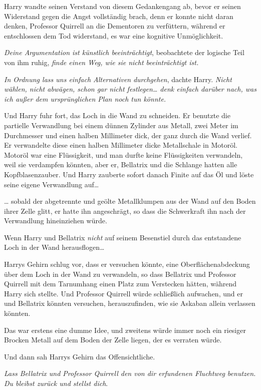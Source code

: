 {Harry wandte seinen Verstand von diesem Gedankengang ab, bevor er seinen Widerstand gegen die Angst vollständig brach, denn er konnte nicht daran denken, Professor Quirrell an die Dementoren zu verfüttern, während er entschlossen dem Tod widerstand, es war eine kognitive Unmöglichkeit.

\emph{Deine Argumentation ist künstlich beeinträchtigt}, beobachtete der logische Teil von ihm ruhig, \emph{finde einen Weg, wie sie nicht beeinträchtigt ist.}

\emph{In Ordnung lass uns einfach Alternativen} \emph{durchgehen}, dachte Harry. \emph{Nicht wählen, nicht abwägen, schon gar nicht festlegen… denk einfach darüber nach, was ich außer dem ursprünglichen Plan noch tun könnte.}

Und Harry fuhr fort, das Loch in die Wand zu schneiden. Er benutzte die partielle Verwandlung bei einem dünnen Zylinder aus Metall, zwei Meter im Durchmesser und einen halben Millimeter dick, der ganz durch die Wand verlief. Er verwandelte diese einen halben Millimeter dicke Metallschale in Motoröl. Motoröl war eine Flüssigkeit, und man durfte keine Flüssigkeiten verwandeln, weil sie verdampfen könnten, aber er, Bellatrix und die Schlange hatten alle Kopfblasenzauber. Und Harry zauberte sofort danach Finite auf das Öl und löste seine eigene Verwandlung auf…

… sobald der abgetrennte und geölte Metallklumpen aus der Wand auf den Boden ihrer Zelle glitt, er hatte ihn angeschrägt, so dass die Schwerkraft ihn nach der Verwandlung hineinziehen würde.

Wenn Harry und Bellatrix \emph{nicht} auf seinem Besenstiel durch das entstandene Loch in der Wand herausflogen…

Harrys Gehirn schlug vor, dass er versuchen könnte, eine Oberflächenabdeckung über dem Loch in der Wand zu verwandeln, so dass Bellatrix und Professor Quirrell mit dem Tarnumhang einen Platz zum Verstecken hätten, während Harry sich stellte. Und Professor Quirrell würde schließlich aufwachen, und er und Bellatrix könnten versuchen, herauszufinden, wie sie Askaban allein verlassen könnten.

Das war erstens eine dumme Idee, und zweitens würde immer noch ein riesiger Brocken Metall auf dem Boden der Zelle liegen, der es verraten würde.

Und dann sah Harrys Gehirn das Offensichtliche.

\emph{Lass Bellatrix und Professor Quirrell den von dir erfundenen Fluchtweg benutzen. Du bleibst zurück und stellst dich}.

}
